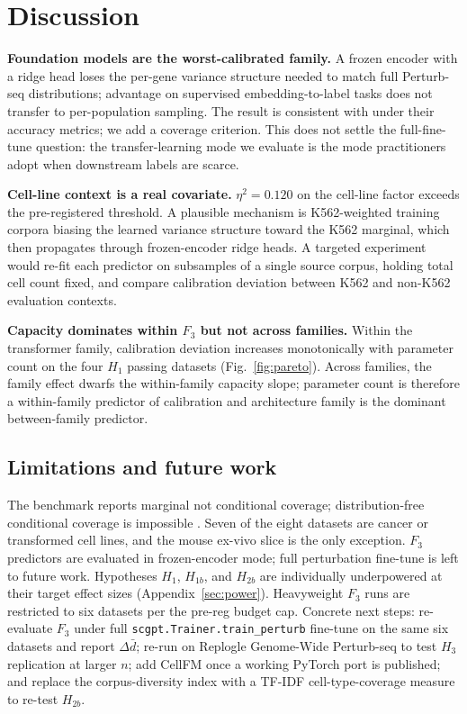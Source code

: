 \documentclass{article}
\begin{document}
\section{Discussion}
\label{sec:discussion}

\noindent\textbf{Foundation models are the worst-calibrated family.}
A frozen encoder with a ridge head loses the per-gene variance
structure needed to match full Perturb-seq distributions; advantage
on supervised embedding-to-label tasks does not transfer to
per-population sampling. The result is consistent with
\citet{ahlmann2025deep,csendes2025train,kedzierska2025zeroshot}
under their accuracy metrics; we add a coverage criterion. This
does not settle the full-fine-tune question: the transfer-learning
mode we evaluate is the mode practitioners adopt when downstream
labels are scarce.

\noindent\textbf{Cell-line context is a real covariate.} $\eta^2 =
0.120$ on the cell-line factor exceeds the pre-registered
threshold. A plausible mechanism is K562-weighted training corpora
biasing the learned variance structure toward the K562 marginal,
which then propagates through frozen-encoder ridge heads. A targeted
experiment would re-fit each predictor on subsamples of a single
source corpus, holding total cell count fixed, and compare
calibration deviation between K562 and non-K562 evaluation contexts.

\noindent\textbf{Capacity dominates within $F_3$ but not across
families.} Within the transformer family, calibration deviation
increases monotonically with parameter count on the four $H_1$
passing datasets (Fig.~\ref{fig:pareto}). Across families, the
family effect dwarfs the within-family capacity slope; parameter
count is therefore a within-family predictor of calibration and
architecture family is the dominant between-family predictor.

\subsection{Limitations and future work}
The benchmark reports marginal not conditional coverage;
distribution-free conditional coverage is impossible
\cite{vovk2012}. Seven of the eight datasets are cancer or
transformed cell lines, and the mouse ex-vivo slice is the only
exception. $F_3$ predictors are evaluated in frozen-encoder mode;
full perturbation fine-tune is left to future work. Hypotheses
$H_1$, $H_{1b}$, and $H_{2b}$ are individually underpowered at
their target effect sizes (Appendix~\ref{sec:power}). Heavyweight
$F_3$ runs are restricted to six datasets per the pre-reg budget
cap. Concrete next steps: re-evaluate $F_3$ under full
\texttt{scgpt.Trainer.train\_perturb} fine-tune on the same six
datasets and report $\Delta \bar d$; re-run on Replogle Genome-Wide
Perturb-seq to test $H_3$ replication at larger $n$; add CellFM
once a working PyTorch port is published; and replace the
corpus-diversity index with a TF-IDF cell-type-coverage measure to
re-test $H_{2b}$.
\end{document}

